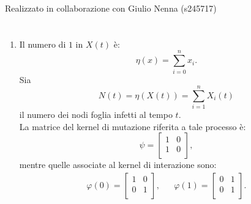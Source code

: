 \documentclass[11pt,largemargins]{homework}
\begin{document}
\maketitle
\begin{center}
Realizzato in collaborazione con Giulio Nenna (s245717)
\end{center}
\section{}%
  
    
    
  \begin{enumerate}
 
  
    \item
     Il numero di $1$ in $X(t)$ è:
     \begin{equation*}
     \eta\left(x\right)= \sum_{i=0}^{n}x_{i}.
     \end{equation*}
    Sia 
    \begin{equation*}
    N\left(t\right)=\eta\left(X\left(t\right)\right)=\sum_{i=1}^{n}X_{i}\left(t\right)
    \end{equation*}
     il numero dei nodi foglia infetti al tempo $t$.\\
     La matrice del kernel di mutazione riferita a tale processo è:
    \begin{equation*}
      \psi=
      \begin{bmatrix}
        1 & 0  \\
        1 & 0  \\
      \end{bmatrix},
      \end{equation*}
  mentre quelle associate al kernel di interazione sono:
   \begin{align*}
      \varphi\left(0\right)=\begin{bmatrix}
        1 & 0\\
        0 & 1 \\ 
      \end{bmatrix}, &&  
      \varphi\left(1\right)=\begin{bmatrix}
         0 & 1\\
        0 & 1 \\ 
      \end{bmatrix}.
    \end{align*}
    

\end{enumerate}
\end{document}
